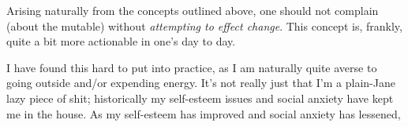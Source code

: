 \documentclass[../butidigress.tex]{subfiles}
\begin{document}
Arising naturally from the concepts outlined above, one should not complain (about the mutable) without \emph{attempting to effect change}.
This concept is, frankly, quite a bit more actionable in one's day to day.

I have found this hard to put into practice, as I am naturally quite averse to going outside and/or expending energy.
It's not really just that I'm a plain-Jane lazy piece of shit; historically my self-esteem issues and social anxiety have kept me in the house.
As my self-esteem has improved and social anxiety has lessened,
\end{document}
